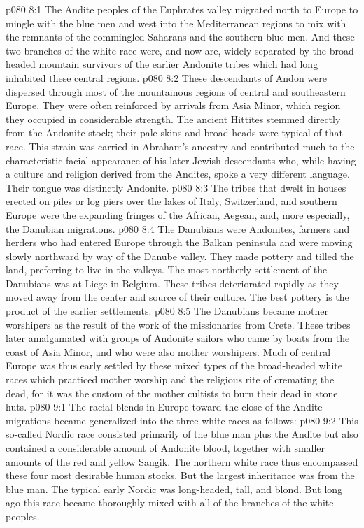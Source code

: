 \vs p080 8:1 The Andite peoples of the Euphrates valley migrated north to Europe to mingle with the blue men and west into the Mediterranean regions to mix with the remnants of the commingled Saharans and the southern blue men. And these two branches of the white race were, and now are, widely separated by the broad\hyp{}headed mountain survivors of the earlier Andonite tribes which had long inhabited these central regions.
\vs p080 8:2 These descendants of Andon were dispersed through most of the mountainous regions of central and southeastern Europe. They were often reinforced by arrivals from Asia Minor, which region they occupied in considerable strength. The ancient Hittites stemmed directly from the Andonite stock; their pale skins and broad heads were typical of that race. This strain was carried in Abraham’s ancestry and contributed much to the characteristic facial appearance of his later Jewish descendants who, while having a culture and religion derived from the Andites, spoke a very different language. Their tongue was distinctly Andonite.
\vs p080 8:3 The tribes that dwelt in houses erected on piles or log piers over the lakes of Italy, Switzerland, and southern Europe were the expanding fringes of the African, Aegean, and, more especially, the Danubian migrations.
\vs p080 8:4 The Danubians were Andonites, farmers and herders who had entered Europe through the Balkan peninsula and were moving slowly northward by way of the Danube valley. They made pottery and tilled the land, preferring to live in the valleys. The most northerly settlement of the Danubians was at Liege in Belgium. These tribes deteriorated rapidly as they moved away from the center and source of their culture. The best pottery is the product of the earlier settlements.
\vs p080 8:5 The Danubians became mother worshipers as the result of the work of the missionaries from Crete. These tribes later amalgamated with groups of Andonite sailors who came by boats from the coast of Asia Minor, and who were also mother worshipers. Much of central Europe was thus early settled by these mixed types of the broad\hyp{}headed white races which practiced mother worship and the religious rite of cremating the dead, for it was the custom of the mother cultists to burn their dead in stone huts.
\vs p080 9:1 The racial blends in Europe toward the close of the Andite migrations became generalized into the three white races as follows:
\pc \vs p080 9:2 \bibnobreakspace {} This so\hyp{}called Nordic race consisted primarily of the blue man plus the Andite but also contained a considerable amount of Andonite blood, together with smaller amounts of the red and yellow Sangik. The northern white race thus encompassed these four most desirable human stocks. But the largest inheritance was from the blue man. The typical early Nordic was long\hyp{}headed, tall, and blond. But long ago this race became thoroughly mixed with all of the branches of the white peoples.
